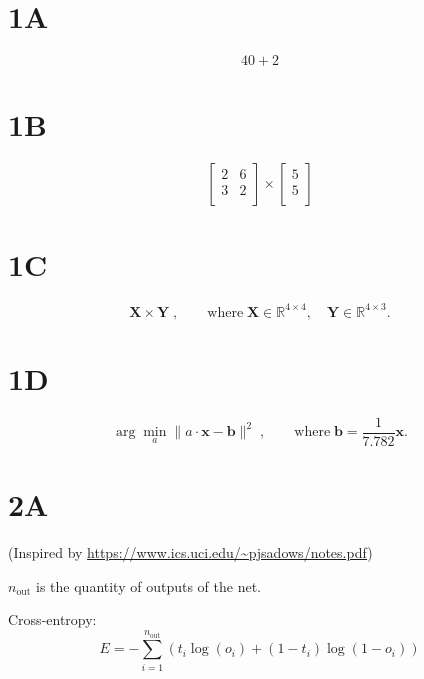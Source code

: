 \documentclass[12pt]{article}
\begin{document}
\section*{1A}

\begin{equation}
40 + 2
\end{equation}

\section*{1B}

\begin{equation}
  \begin{bmatrix}
    2 & 6 \\
    3 & 2 \\
  \end{bmatrix}
  \times
  \begin{bmatrix}
    5 \\
    5 \\
  \end{bmatrix}\end{equation}

\section*{1C}

\begin{equation}
\mathbf{X} \times \mathbf{Y} \;,
\qquad \text{where} \; \mathbf{X} \in \mathbb{R}^{4 \times 4},
\quad \mathbf{Y} \in \mathbb{R}^{4 \times 3}.
\end{equation}

\section*{1D}

\begin{equation}
\arg\min_{a}  \| a \cdot \mathbf{x} - \mathbf{b}\|^2 \;,
\qquad \text{where} \; \mathbf{b} = \frac{1}{7.782} \mathbf{x}.
\end{equation}

\section*{2A}
(Inspired by \url{https://www.ics.uci.edu/~pjsadows/notes.pdf})

$n_\text{out}$ is the quantity of outputs of the net.

Cross-entropy:
\begin{equation}
E = - \sum_{i=1}^{n_\text{out}} \left( t_i \log(o_i) + ( 1 - t_i ) \log(1 - o_i) \right)
\end{equation}
\end{document}
